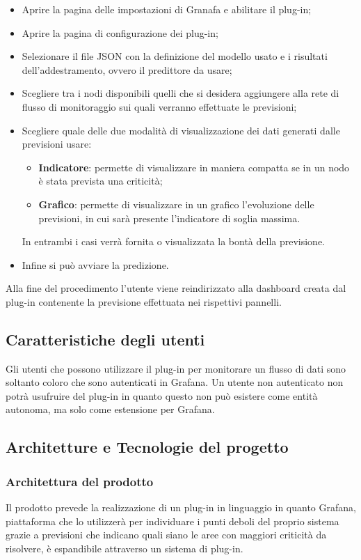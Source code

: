 \documentclass[../analisi-dei-requisiti.tex]{subfiles}
\begin{document}
	\begin{itemize}
		\item{Aprire la pagina delle impostazioni di Granafa e abilitare il plug-in;}
		\item{Aprire la pagina di configurazione dei plug-in;}
		\item{Selezionare il file JSON con la definizione del modello usato e i risultati dell'addestramento, ovvero il predittore da usare;}
		\item{Scegliere tra i nodi disponibili quelli che si desidera aggiungere alla rete di flusso di monitoraggio sui quali verranno effettuate le previsioni;}
		\item{Scegliere quale delle due modalità di visualizzazione dei dati generati dalle previsioni usare:}
		\begin{itemize}
			\item{\textbf{Indicatore}: permette di visualizzare in maniera compatta se in un nodo è stata prevista una criticità;}
			\item{\textbf{Grafico}: permette di visualizzare in un grafico l'evoluzione delle previsioni, in cui sarà presente l'indicatore di soglia massima.}
		\end{itemize}
		In entrambi i casi verrà fornita o visualizzata la bontà della previsione.
		\item{Infine si può avviare la predizione.}
	\end{itemize}
	Alla fine del procedimento l'utente viene reindirizzato alla dashboard creata dal plug-in contenente la previsione effettuata nei rispettivi pannelli.

\subsection{Caratteristiche degli utenti}
\label{subs:caratteristiche_degli_utenti}
  Gli utenti che possono utilizzare il plug-in per monitorare un flusso di dati sono soltanto coloro che sono autenticati in Grafana. Un utente non autenticato non potrà usufruire del plug-in in quanto questo non può esistere come entità autonoma, ma solo come estensione per Grafana.

\subsection{Architetture e Tecnologie del progetto}
\label{subs:architetture_e_tecnologie_del_progetto}

	\subsubsection{Architettura del prodotto}
	\label{sssec:architettura_del_prodotto}
		Il prodotto prevede la realizzazione di un plug-in in linguaggio  in quanto Grafana, piattaforma che lo utilizzerà per individuare i punti deboli del proprio sistema grazie a previsioni che indicano quali siano le aree con maggiori criticità da risolvere, è espandibile attraverso un sistema di plug-in.
\end{document}
